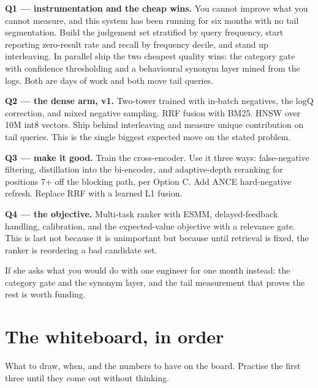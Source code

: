 \documentclass[10pt,twoside]{book}
\newcommand{\cchapter}[1]{\chapter{#1}}
\begin{document}
\textbf{Q1 --- instrumentation and the cheap wins.} You cannot improve what you cannot measure, and this system has been running for six months with no tail segmentation. Build the judgement set stratified by query frequency, start reporting zero-result rate and recall by frequency decile, and stand up interleaving. In parallel ship the two cheapest quality wins: the category gate with confidence thresholding and a behavioural synonym layer mined from the logs. Both are days of work and both move tail queries.\par
\textbf{Q2 --- the dense arm, v1.} Two-tower trained with in-batch negatives, the logQ correction, and mixed negative sampling. RRF fusion with BM25. HNSW over 10M int8 vectors. Ship behind interleaving and measure unique contribution on tail queries. This is the single biggest expected move on the stated problem.\par
\textbf{Q3 --- make it good.} Train the cross-encoder. Use it three ways: false-negative filtering, distillation into the bi-encoder, and adaptive-depth reranking for positions 7+ off the blocking path, per Option C. Add ANCE hard-negative refresh. Replace RRF with a learned L1 fusion.\par
\textbf{Q4 --- the objective.} Multi-task ranker with ESMM, delayed-feedback handling, calibration, and the expected-value objective with a relevance gate. This is last not because it is unimportant but because until retrieval is fixed, the ranker is reordering a bad candidate set.\par
If she asks what you would do with one engineer for one month instead: the category gate and the synonym layer, and the tail measurement that proves the rest is worth funding.\par
\cchapter{The whiteboard, in order}
What to draw, when, and the numbers to have on the board. Practise the first three until they come out without thinking.\par
\end{document}
